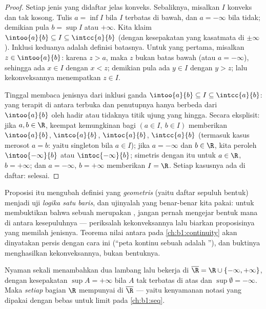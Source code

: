 \begin{proof}
Setiap jenis yang didaftar jelas konveks. Sebaliknya, misalkan $I$ konveks dan
tak kosong. Tulis $a = \inf I$ bila $I$ terbatas di bawah, dan $a =
-\infty$ bila tidak; demikian pula $b = \sup I$ atau $+\infty$. Kita klaim $\intoo{a}{b}
\subseteq I \subseteq \intcc{a}{b}$ (dengan kesepakatan yang kasatmata di
$\pm\infty$). Inklusi keduanya adalah definisi batasnya. Untuk
yang pertama, misalkan $z \in \intoo{a}{b}$: karena $z > a$, maka $z$ bukan
batas bawah (atau $a = -\infty$), sehingga ada $x \in I$ dengan $x < z$;
demikian pula ada $y \in I$ dengan $y > z$; lalu kekonveksannya menempatkan $z \in I$.

Tinggal membaca jenisnya dari inklusi ganda
$\intoo{a}{b} \subseteq I \subseteq \intcc{a}{b}$:  yang
terapit di antara  terbuka dan penutupnya hanya berbeda dari
$\intoo{a}{b}$ oleh hadir atau tidaknya titik ujung yang
hingga. Secara eksplisit: jika $a, b \in \R$, keempat kemungkinan
bagi $(a \in I,\ b \in I)$ memberikan $\intoo{a}{b}$, $\intco{a}{b}$,
$\intoc{a}{b}$, $\intcc{a}{b}$ (termasuk kasus merosot
$a = b$: yaitu singleton bila $a \in I$); jika $a = -\infty$ dan $b \in
\R$, kita peroleh $\intoo{-\infty}{b}$ atau $\intoc{-\infty}{b}$;
simetris dengan itu untuk $a \in \R$, $b = +\infty$; dan $a = -\infty$,
$b = +\infty$ memberikan $I = \R$. Setiap kasusnya ada di daftar: selesai.
\end{proof}

\begin{remark}
Proposisi itu mengubah definisi yang \emph{geometris} (yaitu daftar
sepuluh bentuk) menjadi uji \emph{logika satu baris}, dan ujinyalah
yang benar-benar kita pakai: untuk membuktikan bahwa sebuah  merupakan ,
jangan pernah mengejar bentuk mana di antara kesepuluhnya --- periksalah kekonveksannya
lalu biarkan proposisinya yang memilah jenisnya. Teorema nilai
antara pada \cref{ch:b1:continuity} akan dinyatakan persis
dengan cara ini (``peta kontinu sebuah  adalah
''), dan buktinya menghasilkan kekonveksannya, bukan
bentuknya.
\end{remark}

\begin{remark}
Nyaman sekali menambahkan dua lambang lalu bekerja di $\overline\R = \R
\cup \{-\infty, +\infty\}$, dengan kesepakatan $\sup A = +\infty$
bila $A$ tak terbatas di atas dan $\sup \emptyset = -\infty$. Maka
\emph{setiap}  bagian $\R$ mempunyai  di $\overline\R$ --- yaitu
kenyamanan notasi yang dipakai dengan bebas untuk limit pada \cref{ch:b1:seq}.
\end{remark}

